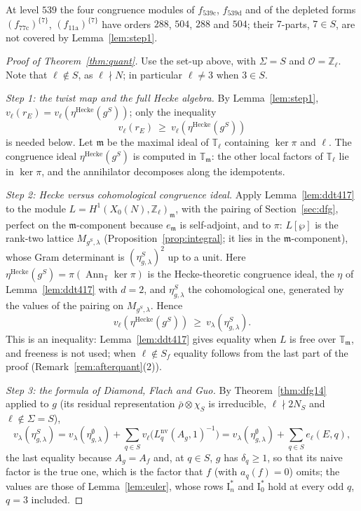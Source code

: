 \documentclass[11pt]{amsart}
\theoremstyle{definition}
\newcommand{\Z}{\mathbb{Z}}
\newcommand{\T}{\mathbb{T}}
\newcommand{\nv}{\mathrm{nv}}
\begin{document}
At level $539$ the four congruence modules of $f_{\text{539c}}$, $f_{\text{539d}}$ and of the depleted forms $(f_{\text{77c}})^{\{7\}}$, $(f_{\text{11a}})^{\{7\}}$ have orders $288$, $504$, $288$ and $504$; their $7$-parts, $7\in S$, are not covered by Lemma~\ref{lem:step1}.

\begin{proof}[Proof of Theorem~\ref{thm:quant}]
Use the set-up above, with $\Sigma=S$ and $\mathcal{O}=\Z_\ell$. Note that $\ell\notin S$, as $\ell\nmid N$; in particular $\ell\ne3$ when $3\in S$.

\emph{Step 1: the twist map and the full Hecke algebra.} By Lemma~\ref{lem:step1}, $v_\ell(r_E)=v_\ell(\eta^{\mathrm{Hecke}}(g^S))$; only the inequality
\[
v_\ell(r_E)\ \ge\ v_\ell(\eta^{\mathrm{Hecke}}(g^S))
\]
is needed below. Let $\mathfrak m$ be the maximal ideal of $\T_\ell$ containing $\ker\pi$ and $\ell$. The congruence ideal $\eta^{\mathrm{Hecke}}(g^S)$ is computed in $\T_{\mathfrak m}$: the other local factors of $\T_\ell$ lie in $\ker\pi$, and the annihilator decomposes along the idempotents.

\emph{Step 2: Hecke versus cohomological congruence ideal.} Apply Lemma~\ref{lem:ddt417} to the module $L=H^1(X_0(N),\Z_\ell)_{\mathfrak m}$, with the pairing of Section~\ref{sec:dfg}, perfect on the $\mathfrak m$-component because $e_{\mathfrak m}$ is self-adjoint, and to $\pi$: $L[\wp]$ is the rank-two lattice $M_{g^S,\lambda}$ (Proposition~\ref{prop:integral}; it lies in the $\mathfrak m$-component), whose Gram determinant is $(\eta^S_{g,\lambda})^2$ up to a unit. Here $\eta^{\mathrm{Hecke}}(g^S)=\pi(\operatorname{Ann}_\T\ker\pi)$ is the Hecke-theoretic congruence ideal, the $\eta$ of Lemma~\ref{lem:ddt417} with $d=2$, and $\eta^S_{g,\lambda}$ the cohomological one, generated by the values of the pairing on $M_{g^S,\lambda}$. Hence
\[
v_\ell(\eta^{\mathrm{Hecke}}(g^S))\ \ge\ v_\lambda(\eta^S_{g,\lambda}).
\]
This is an inequality: Lemma~\ref{lem:ddt417} gives equality when $L$ is free over $\T_{\mathfrak m}$, and freeness is not used; when $\ell\notin S_f$ equality follows from the last part of the proof (Remark~\ref{rem:afterquant}(2)).

\emph{Step 3: the formula of Diamond, Flach and Guo.} By Theorem~\ref{thm:dfg14} applied to $g$ (its residual representation $\bar\rho\otimes\chi_S$ is irreducible, $\ell\nmid 2N_S$ and $\ell\notin\Sigma=S$),
\[
v_\lambda(\eta^S_{g,\lambda})=v_\lambda(\eta^\emptyset_{g,\lambda})+\sum_{q\in S}v_\ell\bigl(L_q^{\nv}(A_g,1)^{-1}\bigr)=v_\lambda(\eta^\emptyset_{g,\lambda})+\sum_{q\in S}e_\ell(E,q),
\]
the last equality because $A_g=A_f$ and, at $q\in S$, $g$ has $\delta_q\ge1$, so that its naive factor is the true one, which is the factor that $f$ (with $a_q(f)=0$) omits; the values are those of Lemma~\ref{lem:euler}, whose rows $\mathrm{I}_n^*$ and $\mathrm{I}_0^*$ hold at every odd $q$, $q=3$ included.


\end{proof}
\end{document}

